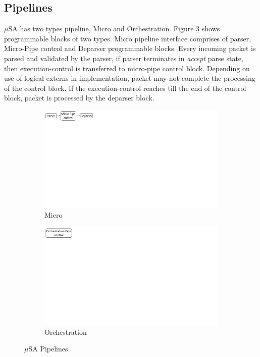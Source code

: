 \subsection{Pipelines}
\label{subsection:pipelines}
$\mu$SA has two types pipeline, Micro and Orchestration.
Figure \ref{fig:msa-pipelines} shows programmable blocks of two types.
Micro pipeline interface comprises of parser, Micro-Pipe control and Deparser programmable blocks.
Every incoming packet is parsed and validated by the parser, if parser terminates in \emph{accept} parse state, then execution-control is transferred to micro-pipe control block.
Depending on use of logical externs in implementation, packet may not complete the processing of the control block.
If the execution-control reaches till the end of the control block, packet is processed by the deparser block.
\begin{figure}[!ht]
    \begin{subfigure}{0.45\linewidth}
        \centering
        \includegraphics[trim=0 482 692 0, clip,scale=0.45]{msa-pipeline}
        \caption{Micro}
        \label{subfig:micro}
    \end{subfigure}
    \begin{subfigure}{0.45\linewidth}
        \centering
        \includegraphics[trim=0 480 805 0,clip,scale=0.45]{micro-orchestration-pipeline}
        \caption{Orchestration}
        \label{subfig:orchestration}
    \end{subfigure}
\caption{$\mu$SA Pipelines}
\label{fig:msa-pipelines}
\end{figure}

